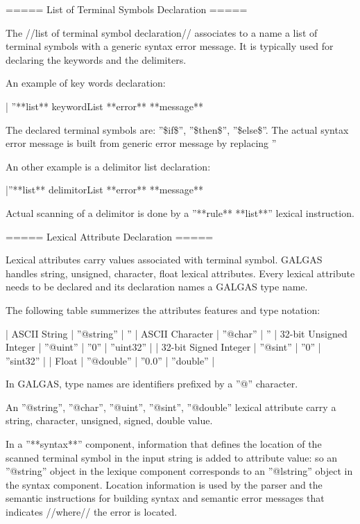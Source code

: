 {===== List of Terminal Symbols Declaration =====

The //list of terminal symbol declaration// associates to a name a list of terminal symbols with a generic syntax error message. It is typically used for declaring the keywords and the delimiters.

An example of key words declaration:

| ''**list** keywordList **error** **message** %

The declared terminal symbols are: ''\$if\$'', ''\$then\$'', ''\$else\$''. The actual syntax error message is built from generic error message by replacing ''%

An other example is a delimitor list declaration:

|''**list** delimitorList **error** **message** %

Actual scanning of a delimitor is done by a ''**rule** **list**'' lexical instruction.

===== Lexical Attribute Declaration =====

Lexical attributes carry values associated with terminal symbol. GALGAS handles string, unsigned, character, float lexical attributes. Every lexical attribute needs to be declared and its declaration names a GALGAS type name.


 The following table summerizes the attributes features and type notation:

| ASCII String | ''@string'' | ''%
| ASCII Character | ''@char'' | ''%
| 32-bit Unsigned Integer | ''@uint'' | ''0'' | ''uint32'' |
| 32-bit Signed Integer | ''@sint'' | ''0'' | ''sint32'' |
| Float | ''@double'' | ''0.0'' | ''double'' |

In GALGAS, type names are identifiers prefixed by a ''@'' character.

An ''@string'', ''@char'', ''@uint'', ''@sint'', ''@double'' lexical attribute carry a string, character, unsigned, signed, double value.

In a ''**syntax**'' component, information that defines the location of the scanned terminal symbol in the input string is added to attribute value: so an ''@string'' object in the lexique component corresponds to an ''@lstring'' object in the syntax component. Location information is used by the parser and the semantic instructions for building syntax and semantic error messages that indicates //where// the error is located.

}
